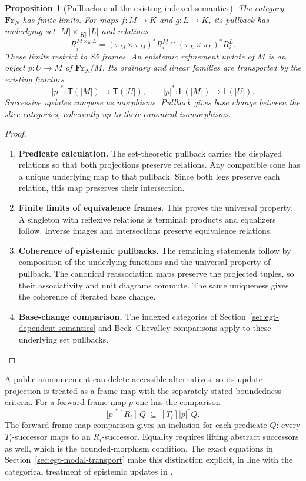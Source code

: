 \documentclass[11pt,a4paper]{article}
\numberwithin{equation}{section}
\newtheorem{proposition}[theorem]{Proposition}
\theoremstyle{definition}
\theoremstyle{remark}
\theoremstyle{plain}
\begin{document}
\begin{proposition}[Pullbacks and the existing indexed semantics]
\label{prop:egt-frame-pullbacks}
The category $\mathbf{Fr}_N$ has finite limits. For maps $f:M\to K$ and
$g:L\to K$, its pullback has underlying set $|M|\times_{|K|}|L|$
and relations
\[
 R_i^{M\times_KL}
 = (\pi_M\times\pi_M)^*R_i^M
   \cap(\pi_L\times\pi_L)^*R_i^L.
\]
These limits restrict to S5 frames. An epistemic refinement update of $M$
is an object $p:U\to M$ of $\mathbf{Fr}_N/M$. Its ordinary and linear families
are transported by the existing functors
\[
 |p|^*:\mathsf T(|M|)\to\mathsf T(|U|),\qquad
 |p|^*:\mathsf L(|M|)\to\mathsf L(|U|).
\]
Successive updates compose as morphisms. Pullback gives base change
between the slice categories, coherently up to their canonical isomorphisms.
\end{proposition}
\begin{proof}
\leavevmode
\begin{enumerate}[label=\textup{(\arabic*)},leftmargin=*,itemsep=4pt,topsep=3pt]
  \item \textbf{Predicate calculation.} The set-theoretic pullback carries the displayed relations so that both
projections preserve relations. Any compatible cone has a unique underlying
map to that pullback. Since both legs preserve each relation, this map
preserves their intersection.
  \item \textbf{Finite limits of equivalence frames.} This proves the universal property. A singleton
with reflexive relations is terminal; products and equalizers follow. Inverse images and intersections preserve equivalence relations.
  \item \textbf{Coherence of epistemic pullbacks.} The remaining statements follow by composition of the underlying functions
and the universal property of pullback. The canonical reassociation maps
preserve the projected tuples, so their associativity and unit diagrams
commute. The same uniqueness gives the coherence of iterated base change.
  \item \textbf{Base-change comparison.} The indexed categories of
Section~\ref{sec:egt-dependent-semantics}
and Beck--Chevalley comparisons apply to these underlying set pullbacks.
\end{enumerate}
\end{proof}

A public announcement can delete accessible alternatives, so its update projection is treated as a frame map with the separately stated boundedness criteria.
For a forward frame map $p$ one has the comparison
\[
 |p|^*[R_i]\,Q\ \subseteq\ [T_i]|p|^*Q.
\]
The forward frame-map comparison gives an inclusion for each
predicate $Q$: every $T_i$-successor maps to an $R_i$-successor.
Equality requires lifting abstract successors as well, which is the
bounded-morphism condition. The exact equations in
Section~\ref{sec:egt-modal-transport} make this distinction explicit,
in line with the categorical treatment of epistemic updates in
\citep{Kishida2017CategoriesDEL}.
\end{document}
